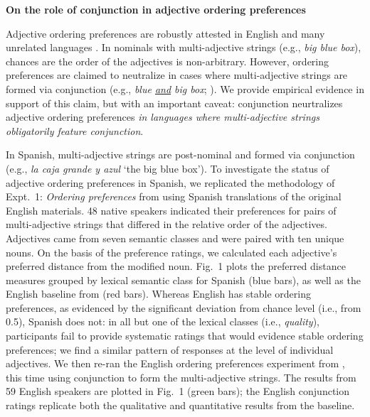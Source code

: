 \documentclass[10pt]{article}
\begin{document}

\begin{center}
	\textbf{On the role of conjunction in adjective ordering preferences}
\end{center}
Adjective ordering preferences are robustly attested in English and many unrelated languages \citep{dixon1982,sproatshih1991,scontrasetal2017adjectives}. In nominals with multi-adjective strings (e.g., \emph{big blue box}), chances are the order of the adjectives is non-arbitrary. However, ordering preferences are claimed to neutralize in cases where multi-adjective strings are formed via conjunction (e.g., \emph{blue \uline{and} big box}; \citealp{fordolson1975,byrne1979}). We provide empirical evidence in support of this claim, but with an important caveat: conjunction neurtralizes adjective ordering preferences \emph{in languages where multi-adjective strings obligatorily feature conjunction}. %

In Spanish, multi-adjective strings are post-nominal and formed via conjunction (e.g., \emph{la caja grande \uline{y} azul} `the big blue box'). To investigate the status of adjective ordering preferences in Spanish, we replicated the methodology of Expt.~1: \emph{Ordering preferences} from \cite{scontrasetal2017adjectives} using Spanish translations of the original English materials. 48 native speakers indicated their preferences for pairs of multi-adjective strings that differed in the relative order of the adjectives.  Adjectives came from seven semantic classes and were paired with ten unique nouns. On the basis of the preference ratings, we calculated each adjective's preferred distance from the modified noun. Fig.~1 plots the preferred distance measures grouped by lexical semantic class for Spanish (blue bars), as well as the English baseline from \citeauthor{scontrasetal2017adjectives} (red bars). Whereas English has stable ordering preferences, as evidenced by the significant deviation from chance level (i.e., from 0.5), Spanish does not: in all but one of the lexical classes (i.e., \emph{quality}), participants fail to provide systematic ratings that would evidence stable ordering preferences; we find a similar pattern of responses at the level of individual adjectives. We then re-ran the English ordering preferences experiment  from \citeauthor{scontrasetal2017adjectives}, this time using conjunction to form the multi-adjective strings. The results from 59 English speakers are plotted in Fig.~1 (green bars); the English conjunction ratings replicate both the qualitative and quantitative results from the \citeauthor{scontrasetal2017adjectives} baseline.
\end{document}
